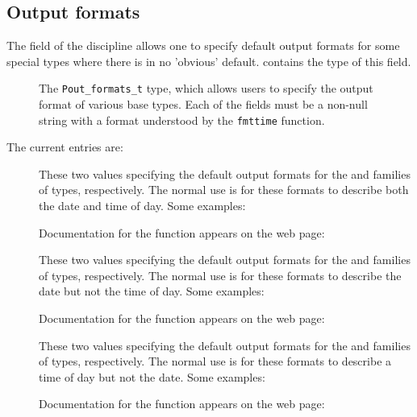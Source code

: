 \subsection{Output formats}
\label{sec:library-customization-output-formats}
The  field of the discipline allows one to specify
default output formats for some special types where there is 
in no 'obvious' default.  contains the type
of this field.
\begin{figure}
\caption{The \texttt{Pout\_formats\_t} type, which allows users to specify the
  output format of various \pads{} base types. Each of the fields must
  be a non-null string with a format understood by the \texttt{fmttime} function.}
\label{fig:output-formats}
\end{figure}
The current entries are:
\begin{description}
\item[]
\item[]
These two values specifying the default output formats for the 
and  families of types, respectively.  The normal use is for these formats
to describe both the date and time of day.  Some examples:

%
\noindent
Documentation for the  function appears on the web page:


\item[]
\item[]
These two values specifying the default output formats for the 
and  families of types, respectively.  The normal use is for these formats
to describe the date but not the time of day.  Some examples:

%
\noindent
Documentation for the  function appears on the web page:



\item[]
\item[]
These two values specifying the default output formats for the 
and  families of types, respectively.  The normal use is for these formats
to describe a time of day but not the date.  Some examples:

%
\noindent
Documentation for the  function appears on the web page:
\end{description}

